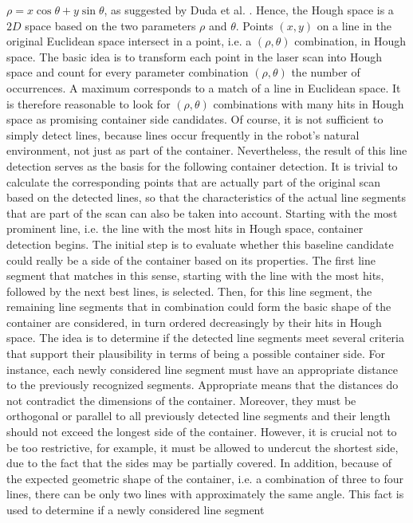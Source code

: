 \documentclass[english, master, utf8]{base/thesis_KBS}
\begin{document}
$\rho = x \cos{\theta} + y \sin{\theta}$, as suggested by Duda et al. \cite{Duda:1972}. Hence, the Hough space is a $2D$ space based on the two parameters $\rho$ and $\theta$. Points
$(x, y)$ on a line in the original Euclidean space intersect in a point, i.e. a $(\rho, \theta)$ combination, in Hough space. The basic idea is to transform each point in the laser
scan into Hough space and count for every parameter combination $(\rho, \theta)$ the number of occurrences. A maximum corresponds to a  match of a line in Euclidean
space. It is therefore reasonable to look for $(\rho, \theta)$ combinations with many hits in Hough space as promising container side candidates. Of course, it is not sufficient to
simply detect lines, because lines occur frequently in the robot's natural environment, not just as part of the container. Nevertheless, the result of this line detection serves as
the basis for the following container detection. It is trivial to calculate the corresponding points that are actually part of the original scan based on the detected lines, so that
the characteristics of the actual line segments that are part of the scan can also be taken into account. Starting with the most prominent line, i.e. the line with the most hits in
Hough space, container detection begins. The initial step is to evaluate whether this baseline candidate could really be a side of the container based on its properties. The first
line segment that matches in this sense, starting with the line with the most hits, followed by the next best lines, is selected. Then, for this line segment, the remaining line
segments that in combination could form the basic shape of the container are considered, in turn ordered decreasingly by their hits in Hough space. The idea is to determine if the
detected line segments meet several criteria that support their plausibility in terms of being a possible container side. For instance, each newly considered line segment must have
an appropriate distance to the previously recognized segments. Appropriate means that the distances do not contradict the dimensions of the container. Moreover, they must be
orthogonal or parallel to all previously detected line segments and their length should not exceed the longest side of the container. However, it is crucial not to be too restrictive,
for example, it must be allowed to undercut the shortest side, due to the fact that the sides may be partially covered. In addition, because of the expected geometric shape of the
container, i.e. a combination of three to four lines, there can be only two lines with approximately the same angle. This fact is used to determine if a newly considered line segment
\end{document}
